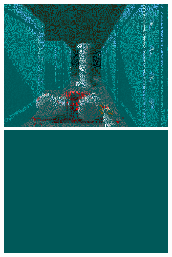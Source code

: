 \begin{minipage}{\textwidth}
\centering
  \includegraphics[width=.9\textwidth]{screenshots/fizzlefade/boss/screenshot_102.png}\\
\vspace*{0.5cm}
  \includegraphics[width=.9\textwidth]{screenshots/fizzlefade/boss/screenshot_130.png}\\
\end{minipage}


